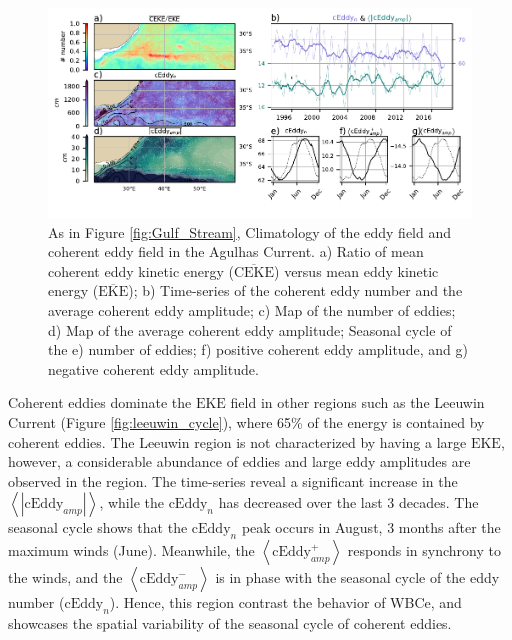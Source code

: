 \documentclass[draft,linenumbers]{agujournal2019}
\newcommand{\MEKE}{\overline{\textrm{EKE}}}
\newcommand{\EKE}{\textrm{EKE}}
\newcommand{\MCEKE}{\overline{\textrm{CEKE}}}
\newcommand{\cEddy}{\textrm{cEddy}}
\begin{document}
	\begin{figure}
	    \centering
	    \includegraphics[width=1\textwidth]{figures/regional_ratios_and_stats_V3_2.pdf}
	    \caption{As in Figure \ref{fig:Gulf_Stream}, Climatology of the eddy field and coherent eddy field in the Agulhas Current. a) Ratio of mean coherent eddy kinetic energy ($\MCEKE$) versus mean eddy kinetic energy ($\MEKE$); b) Time-series of the coherent eddy number and the average coherent eddy amplitude; c) Map of the number of eddies; d) Map of the average coherent eddy amplitude; Seasonal cycle of the e) number of eddies; f) positive coherent eddy amplitude, and g) negative coherent eddy amplitude.}
	    \label{fig:Agulhas}
	\end{figure}


	Coherent eddies dominate the $\EKE$ field in other regions such as the Leeuwin Current (Figure \ref{fig:leeuwin_cycle}), where 65\% of the energy is contained by coherent eddies. 
	The Leeuwin region is not characterized by having a large $\EKE$, however, a considerable abundance of eddies and large eddy amplitudes are observed in the region. 
	The time-series reveal a significant increase in the $\left<|\cEddy_{amp}|\right>$, while the $\cEddy_{n}$ has decreased over the last 3 decades. 
	The seasonal cycle shows that the $\cEddy_{n}$ peak occurs in August, 3 months after the maximum winds (June). 
	Meanwhile, the $\left<\cEddy_{amp}^+\right>$ responds in synchrony to the winds, and the $\left<\cEddy_{amp}^-\right>$ is in phase with the seasonal cycle of the eddy number ($\cEddy_{n}$). 
	Hence, this region contrast the behavior of WBCe, and showcases the spatial variability of the seasonal cycle of coherent eddies.
 		
\end{document}
